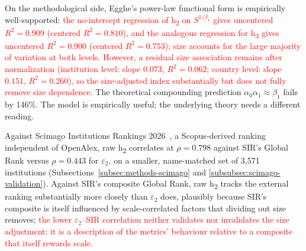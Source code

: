 On the methodological side, Egghe's power-law functional form is empirically well-supported: \textcolor{red}{the no-intercept regression of h\textsubscript{2} on $S^{1/\beta_1}$ gives uncentered $R^2 = 0.909$ (centered $R^2 = 0.810$), and the analogous regression for h\textsubscript{3} gives uncentered $R^2 = 0.900$ (centered $R^2 = 0.753$); size accounts for the large majority of variation at both levels. However, a residual size association remains after normalization (institution level: slope $0.073$, $R^2 = 0.062$; country level: slope $0.151$, $R^2 = 0.260$), so the size-adjusted index substantially but does not fully remove size dependence.} The theoretical compounding prediction $\alpha_0\alpha_1 \approx \beta_1$ fails by 146\%. %
The model is empirically useful; the underlying theory needs a different reading.

Against Scimago Institutions Rankings 2026~\citep{scimago2026}, a Scopus-derived ranking independent of OpenAlex, raw h\textsubscript{2} correlates at $\rho=0.798$ against SIR's Global Rank versus $\rho=0.443$ for $\varepsilon_2$, on a smaller, name-matched set of 3,571 institutions (Subsections~\ref{subsec:methods-scimago} and \ref{subsubsec:scimago-validation}). Against SIR's composite Global Rank, raw h\textsubscript{2} tracks the external ranking substantially more closely than $\varepsilon_2$ does, plausibly because SIR's composite is itself influenced by scale-correlated factors that dividing out size removes; \textcolor{red}{the lower $\varepsilon_2$--SIR correlation neither validates nor invalidates the size adjustment; it is a description of the metrics' behaviour relative to a composite that itself rewards scale.}


